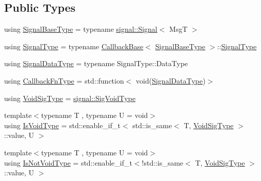 \subsection*{Public Types}
\begin{DoxyCompactItemize}
\item 
using \hyperlink{structvt_1_1pipe_1_1callback_1_1_callback_anon_a84629a45a0c53a8804a4fa68b6b4aaa7}{Signal\+Base\+Type} = typename \hyperlink{structvt_1_1pipe_1_1signal_1_1_signal}{signal\+::\+Signal}$<$ MsgT $>$
\item 
using \hyperlink{structvt_1_1pipe_1_1callback_1_1_callback_anon_a710e9366e47c727549714e568b622f85}{Signal\+Type} = typename \hyperlink{structvt_1_1pipe_1_1callback_1_1_callback_base}{Callback\+Base}$<$ \hyperlink{structvt_1_1pipe_1_1callback_1_1_callback_anon_a84629a45a0c53a8804a4fa68b6b4aaa7}{Signal\+Base\+Type} $>$\+::\hyperlink{structvt_1_1pipe_1_1callback_1_1_callback_anon_a710e9366e47c727549714e568b622f85}{Signal\+Type}
\item 
using \hyperlink{structvt_1_1pipe_1_1callback_1_1_callback_anon_ac503b95feb44bb0b60c1d69e1ed29074}{Signal\+Data\+Type} = typename Signal\+Type\+::\+Data\+Type
\item 
using \hyperlink{structvt_1_1pipe_1_1callback_1_1_callback_anon_a2532c5d78c1fb298d4a369aae7b45e85}{Callback\+Fn\+Type} = std\+::function$<$ void(\hyperlink{structvt_1_1pipe_1_1callback_1_1_callback_anon_ac503b95feb44bb0b60c1d69e1ed29074}{Signal\+Data\+Type})$>$
\item 
using \hyperlink{structvt_1_1pipe_1_1callback_1_1_callback_anon_a37f2e8be7b6c014a2a33232b678a05cc}{Void\+Sig\+Type} = \hyperlink{namespacevt_1_1pipe_1_1signal_acbe257d1ae44f20fa9fd9b6ed3057caf}{signal\+::\+Sig\+Void\+Type}
\item 
{\footnotesize template$<$typename T , typename U  = void$>$ }\\using \hyperlink{structvt_1_1pipe_1_1callback_1_1_callback_anon_a3aa19d4a1044d57ba4af22015331c20a}{Is\+Void\+Type} = std\+::enable\+\_\+if\+\_\+t$<$ std\+::is\+\_\+same$<$ T, \hyperlink{structvt_1_1pipe_1_1callback_1_1_callback_anon_a37f2e8be7b6c014a2a33232b678a05cc}{Void\+Sig\+Type} $>$\+::value, U $>$
\item 
{\footnotesize template$<$typename T , typename U  = void$>$ }\\using \hyperlink{structvt_1_1pipe_1_1callback_1_1_callback_anon_a91e58fe2f8165c826cecedde7e4535cf}{Is\+Not\+Void\+Type} = std\+::enable\+\_\+if\+\_\+t$<$!std\+::is\+\_\+same$<$ T, \hyperlink{structvt_1_1pipe_1_1callback_1_1_callback_anon_a37f2e8be7b6c014a2a33232b678a05cc}{Void\+Sig\+Type} $>$\+::value, U $>$
\end{DoxyCompactItemize}
